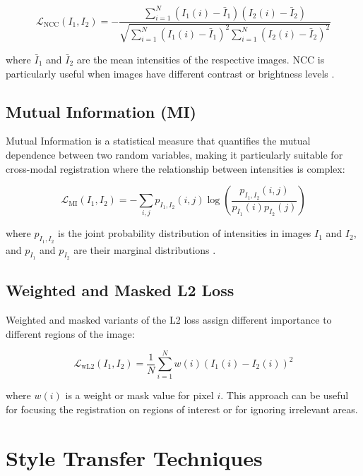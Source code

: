 \begin{equation}
    \mathcal{L}_{\text{NCC}}(I_1, I_2) = -\frac{\sum_{i=1}^{N} (I_1(i) - \bar{I}_1)(I_2(i) - \bar{I}_2)}{\sqrt{\sum_{i=1}^{N} (I_1(i) - \bar{I}_1)^2 \sum_{i=1}^{N} (I_2(i) - \bar{I}_2)^2}}
\end{equation}

where $\bar{I}_1$ and $\bar{I}_2$ are the mean intensities of the respective images. NCC is particularly useful when images have different contrast or brightness levels \parencite{nccreg}.

\subsection{Mutual Information (MI)}

Mutual Information is a statistical measure that quantifies the mutual dependence between two random variables, making it particularly suitable for cross-modal registration where the relationship between intensities is complex:

\begin{equation}
    \mathcal{L}_{\text{MI}}(I_1, I_2) = -\sum_{i,j} p_{I_1,I_2}(i,j) \log\left(\frac{p_{I_1,I_2}(i,j)}{p_{I_1}(i)p_{I_2}(j)}\right)
\end{equation}

where $p_{I_1,I_2}$ is the joint probability distribution of intensities in images $I_1$ and $I_2$, and $p_{I_1}$ and $p_{I_2}$ are their marginal distributions \parencite{mi2003}.

\subsection{Weighted and Masked L2 Loss}

Weighted and masked variants of the L2 loss assign different importance to different regions of the image:

\begin{equation}
    \mathcal{L}_{\text{wL2}}(I_1, I_2) = \frac{1}{N} \sum_{i=1}^{N} w(i) (I_1(i) - I_2(i))^2
\end{equation}

where $w(i)$ is a weight or mask value for pixel $i$. This approach can be useful for focusing the registration on regions of interest or for ignoring irrelevant areas.

\section{Style Transfer Techniques}

